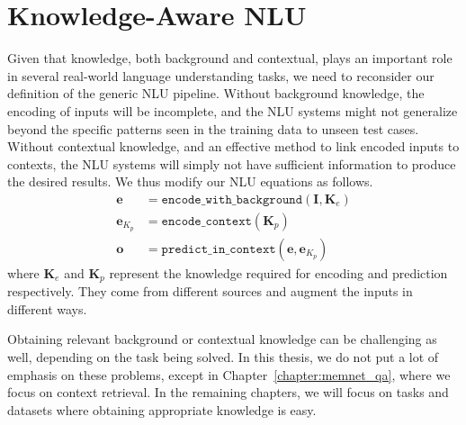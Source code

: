 \section{Knowledge-Aware NLU}
Given that knowledge, both background and contextual, plays an important role in several real-world language understanding tasks, we need to reconsider
our definition of the generic NLU pipeline.
Without background knowledge, the encoding of inputs will be incomplete, and the NLU systems might not generalize beyond the specific patterns 
seen in the training data to unseen test cases. Without contextual knowledge, and an effective method to link encoded inputs to contexts, the NLU
systems will simply not have sufficient information to produce the desired results. We thus modify our NLU equations as follows.
\begin{align}
 \mathbf{e} &= \mathtt{encode\_with\_background}(\mathbf{I}, \mathbf{K}_e) \label{eq:encoding_with_knowledge}\\
 \mathbf{e}_{K_p} &= \mathtt{encode\_context}(\mathbf{K}_p) \\ \label{eq:knowledge_encoding}
 \mathbf{o} &= \mathtt{predict\_in\_context}(\mathbf{e}, \mathbf{e}_{K_p}) \label{eq:prediction_with_knowledge}
\end{align}
where $\mathbf{K}_e$ and $\mathbf{K}_p$ represent the knowledge required for encoding and prediction respectively. They
come from different sources and augment the inputs in different ways.

Obtaining relevant background or contextual
knowledge can be challenging as well, depending on the task being solved. In this thesis, we do not put a lot of emphasis on these
problems, except in Chapter~\ref{chapter:memnet_qa}, where we focus on context retrieval. In the remaining chapters, we will focus on tasks
and datasets where obtaining appropriate knowledge is easy.


